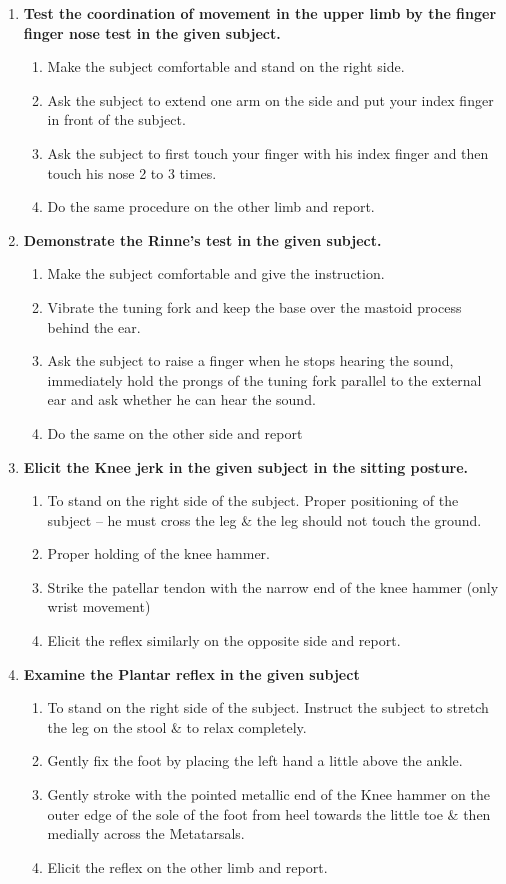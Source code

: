 \documentclass[a4paper,10pt]{article}
\begin{document}
\begin{enumerate}[I]
		\item \textbf{Test the coordination of movement in the upper limb by the finger finger nose test in the given subject.}
		\begin{enumerate}[1]
		\item Make the subject comfortable and stand on the right side.
		\item Ask the subject to extend one arm on the side and put your index finger in front of the subject.
		\item Ask the subject to first touch your finger with his index finger and then touch his nose 2 to 3 times.
		\item Do the same procedure on the other limb and report.
		\end{enumerate}
		
		\item \textbf{Demonstrate the Rinne’s test in the given subject.}
		\begin{enumerate}[1]
		\item Make the subject comfortable and give the instruction.
		\item Vibrate the tuning fork and keep the base over the mastoid process behind the ear.
		\item Ask the subject to raise a finger when he stops hearing the sound, immediately hold the prongs of the tuning fork parallel to the external ear and ask whether  he can hear the sound.
		\item Do the same on the other side and report	
		\end{enumerate}
		
		\item \textbf{Elicit the Knee jerk in the given subject in the sitting posture.}
		\begin{enumerate}[1]
		\item To stand on the right side of the subject. Proper positioning of the subject -- he must cross the leg \& the leg should not touch the ground.
		\item Proper holding of the knee hammer.
		\item Strike the patellar tendon with the narrow end of the knee hammer (only wrist movement)
		\item Elicit the reflex similarly on the opposite side and report.
		\end{enumerate}
		
		\item \textbf{Examine the Plantar reflex in the given subject}
		\begin{enumerate}[1]
		\item To stand on the right side of the subject. Instruct the subject to stretch the leg on the stool \& to relax completely.
		\item Gently fix the foot by placing the left hand a little above the ankle.
		\item Gently stroke with the pointed metallic end of the Knee hammer on the outer edge of the sole of the foot from heel towards the little toe \& then medially across the Metatarsals.
		\item Elicit the reflex on the other limb and report.
		\end{enumerate}
	\end{enumerate}
\end{document}
